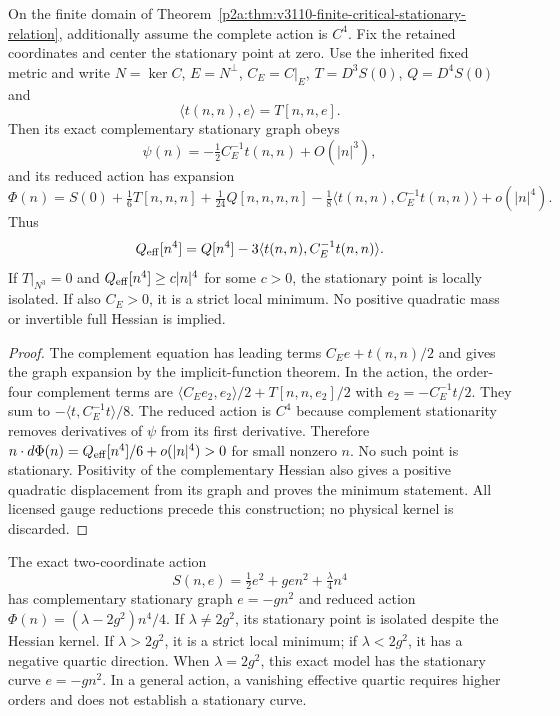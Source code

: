 \documentclass[12pt,a4paper]{article}
\begin{document}
\begin{proposition}
\label{p2a:prop:v257-effective-critical-quartic}
On the finite domain of
Theorem~\ref{p2a:thm:v3110-finite-critical-stationary-relation}, additionally
assume the complete action is $C^4$. Fix the retained coordinates and
center the stationary point at zero. Use the inherited fixed metric and
write $N=\ker C$, $E=N^\perp$, $C_E=C|_E$, $T=D^3S(0)$,
$Q=D^4S(0)$ and
\[
 \langle t(n,n),e\rangle=T[n,n,e].
\]
Then its exact complementary stationary graph obeys
\[
 \psi(n)=-\tfrac12C_E^{-1}t(n,n)+O(|n|^3),
\]
and its reduced action has expansion
\[
 \Phi(n)=S(0)+\tfrac16T[n,n,n]+\tfrac1{24}Q[n,n,n,n]
 -\tfrac18\langle t(n,n),C_E^{-1}t(n,n)\rangle+o(|n|^4).
\]
Thus
\[
 Q_{\rm eff}[n^4]=Q[n^4]-3\langle t(n,n),C_E^{-1}t(n,n)\rangle.
\]
If $T|_{N^3}=0$ and $Q_{\rm eff}[n^4]\ge c|n|^4$ for some $c>0$,
the stationary point is locally isolated. If also $C_E>0$, it is a strict
local minimum. No positive quadratic mass or invertible full Hessian is
implied.
\end{proposition}
\begin{proof}
The complement equation has leading terms $C_Ee+t(n,n)/2$ and gives
the graph expansion by the implicit-function theorem. In the action,
the order-four complement terms are
$\langle C_Ee_2,e_2\rangle/2+T[n,n,e_2]/2$ with
$e_2=-C_E^{-1}t/2$. They sum to $-\langle t,C_E^{-1}t\rangle/8$.
The reduced action is $C^4$ because complement stationarity removes
derivatives of $\psi$ from its first derivative. Therefore
$n\cdot d\Phi(n)=Q_{\rm eff}[n^4]/6+o(|n|^4)>0$ for small nonzero $n$.
No such point is stationary. Positivity of the complementary Hessian
also gives a positive quadratic displacement from its graph and proves
the minimum statement. All licensed gauge reductions precede this
construction; no physical kernel is discarded.
\end{proof}

\begin{remark}
\label{p2a:rem:v257-critical-quartic-control}
The exact two-coordinate action
\[
 S(n,e)=\tfrac12e^2+gen^2+\tfrac\lambda4n^4
\]
has complementary stationary graph $e=-gn^2$ and reduced action
$\Phi(n)=(\lambda-2g^2)n^4/4$. If $\lambda\ne2g^2$, its stationary
point is isolated despite the Hessian kernel. If $\lambda>2g^2$, it is
a strict local minimum; if $\lambda<2g^2$, it has a negative quartic
direction. When $\lambda=2g^2$, this exact model has the stationary
curve $e=-gn^2$. In a general action, a vanishing effective quartic
requires higher orders and does not establish a stationary curve.
\end{remark}
\end{document}
